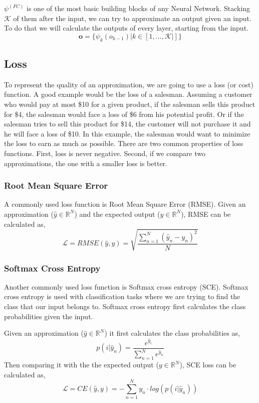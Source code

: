 $\psi^{(FC)}$ is one of the most basic building blocks of any Neural Network. Stacking $\mathcal{K}$ of them after the input, we can try to approximate an output given an input. To do that we will calculate the outputs of every layer, starting from the input. 
$$ \mathbf{o} = \{\psi_{k}(o_{k-1}) | k \in [1, \ldots, \mathcal{K}|] \} $$

\subsection{Loss}

To represent the quality of an approximation, we are going to use a loss (or cost) function. A good example would be the loss of a salesman. Assuming a customer who would pay at most \$10 for a given product, if the salesman sells this product for \$4, the salesman would face a loss of \$6 from his potential profit. Or if the salesman tries to sell this product for \$14, the customer will not purchase it and he will face a loss of \$10. In this example, the salesman would want to minimize the loss to earn as much as possible. There are two common properties of loss functions. First, loss is never negative. Second, if we compare two approximations, the one with a smaller loss is better.

\subsubsection{Root Mean Square Error}
A commonly used loss function is Root Mean Square Error (RMSE). Given an approximation ($\hat y \in \mathbb{R}^N$) and the expected output ($y \in \mathbb{R}^N$), RMSE can be calculated as,
\begin{equation*}
\mathcal{L} = RMSE(\hat y, y) = \sqrt{\frac{\sum^N_{n=1} (\hat y_n - y_n)^2 }{N}}
\end{equation*}

\subsubsection{Softmax Cross Entropy}
Another commonly used loss function is Softmax cross entropy (SCE). Softmax cross entropy is used with classification tasks where we are trying to find the class that our input belongs to. Softmax cross entropy first calculates the class probabilities given the input.

Given an approximation ($\hat y \in \mathbb{R}^N$) it first calculates the class probabilities as, 
$$p(i | \hat y_n) = \frac{e^{\hat y_i}}{\sum_{n=1}^{N}e^{\hat y_n}}$$
Then comparing it with the the expected output ($y \in \mathbb{R}^N$), SCE loss can be calculated as,
$$\mathcal{L} = CE(\hat y, y) = - \sum_{n=1}^{N} y_{n} \cdot log(p(i | \hat y_n))$$

